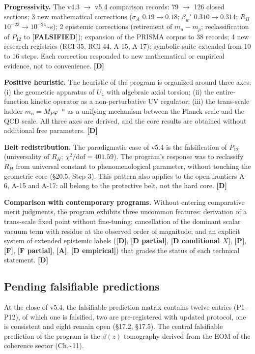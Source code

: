 ﻿\documentclass[11pt,letterpaper]{article}
\begin{document}
\textbf{Progressivity.} The v4.3 $\to$ v5.4 comparison records: 79 $\to$ 126 closed sections; 3 new mathematical corrections ($\sigma_A$ $0{.}19 \to 0{.}18$; $\beta_w'$ $0{.}310 \to 0{.}314$; $R_H$ $10^{-23} \to 10^{-24}$\textasciitilde{}s); 2 epistemic corrections (retirement of $m_n - m_p$; reclassification of $P_{12}$ to \textbf{[FALSIFIED]}); expansion of the PRISMA corpus to 38 records; 4 new research registries (RCI-35, RCI-44, A-15, A-17); symbolic suite extended from 10 to 16 steps. Each correction responded to new mathematical or empirical evidence, not to convenience. \textbf{[D]}

\textbf{Positive heuristic.} The heuristic of the program is organized around three axes: (i) the geometric apparatus of $U_4$ with algebraic axial torsion; (ii) the entire-function kinetic operator as a non-perturbative UV regulator; (iii) the trans-scale ladder $m_n = M_P \varphi^{-n}$ as a unifying mechanism between the Planck scale and the QCD scale. All three axes are derived, and the core results are obtained without additional free parameters. \textbf{[D]}

\textbf{Belt redistribution.} The paradigmatic case of v5.4 is the falsification of $P_{12}$ (universality of $R_H$; $\chi^2/\text{dof} = 401{.}59$). The program's response was to reclassify $R_H$ from universal constant to phenomenological parameter, without touching the geometric core (§20.5, Step 3). This pattern also applies to the open frontiers A-6, A-15 and A-17: all belong to the protective belt, not the hard core. \textbf{[D]}

\textbf{Comparison with contemporary programs.} Without entering comparative merit judgments, the program exhibits three uncommon features: derivation of a trans-scale fixed point without fine-tuning; cancellation of the dominant scalar vacuum term with residue at the observed order of magnitude; and an explicit system of extended epistemic labels (\textbf{[D]}, \textbf{[D partial]}, \textbf{[D conditional $X$]}, \textbf{[P]}, \textbf{[F]}, \textbf{[F partial]}, \textbf{[A]}, \textbf{[D empirical]}) that grades the status of each technical statement. \textbf{[D]}
\subsection{Pending falsifiable predictions}
At the close of v5.4, the falsifiable prediction matrix contains twelve entries (P1--P12), of which one is falsified, two are pre-registered with updated protocol, one is consistent and eight remain open (§17.2, §17.5). The central falsifiable prediction of the program is the $\beta(z)$ tomography derived from the EOM of the coherence sector (Ch.\textasciitilde{}11).
\end{document}

